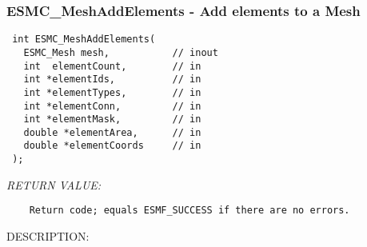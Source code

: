  
\setlength{\oldparskip}{\parskip}
\setlength{\parskip}{1.5ex}
\setlength{\oldparindent}{\parindent}
\setlength{\parindent}{0pt}
\setlength{\oldbaselineskip}{\baselineskip}
\setlength{\baselineskip}{11pt}
 
\def\bv{\begin{verbatim}}
\def\ev{\end{verbatim}}
\def\be{\begin{equation}}
\def\ee{\end{equation}}
\def\bea{\begin{eqnarray}}
\def\eea{\end{eqnarray}}
\def\bi{\begin{itemize}}
\def\ei{\end{itemize}}
\def\bn{\begin{enumerate}}
\def\en{\end{enumerate}}
\def\bd{\begin{description}}
\def\ed{\end{description}}
\def\({\left (}
\def\){\right )}
\def\[{\left [}
\def\]{\right ]}
\def\<{\left  \langle}
\def\>{\right \rangle}
\def\cI{{\cal I}}
\def\diag{\mathop{\rm diag}}
\def\tr{\mathop{\rm tr}}


 
\subsubsection [ESMC\_MeshAddElements] {ESMC\_MeshAddElements - Add elements to a Mesh \label{sec:mesh:capi:meshaddelements}}


  
\begin{verbatim} int ESMC_MeshAddElements(
   ESMC_Mesh mesh,           // inout
   int  elementCount,        // in
   int *elementIds,          // in
   int *elementTypes,        // in
   int *elementConn,         // in
   int *elementMask,         // in
   double *elementArea,      // in
   double *elementCoords     // in
 );
 \end{verbatim}{\em RETURN VALUE:}
\begin{verbatim}    Return code; equals ESMF_SUCCESS if there are no errors.\end{verbatim}
{\sf DESCRIPTION:\\ }



